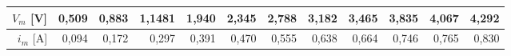 

\begin{tabular}{r|r|r|r|r|r|r|r|r|r|r|r}
\(V_m\) [V]&0,509&0,883&1,1481&1,940&2,345&2,788&3,182&3,465&3,835& 4,067&4,292\\\hline
\(i_m\) [A]&0,094&0,172&0,297 &0,391&0,470&0,555&0,638&0,664&0,746&0,765&0,830
\end{tabular}